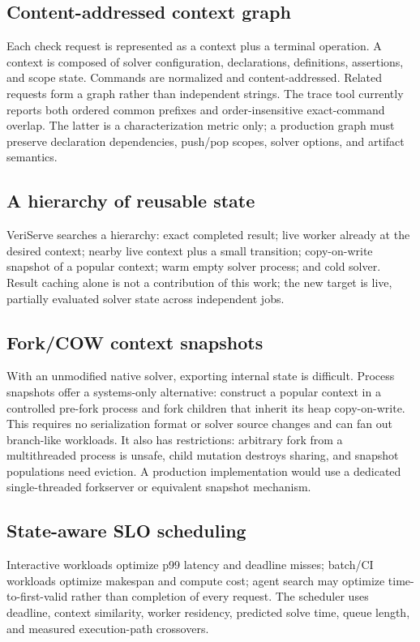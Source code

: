 \documentclass[10pt,twocolumn]{article}
\begin{document}
\subsection{Content-addressed context graph}
Each check request is represented as a context plus a terminal operation. A context is composed of solver configuration, declarations, definitions, assertions, and scope state. Commands are normalized and content-addressed. Related requests form a graph rather than independent strings. The trace tool currently reports both ordered common prefixes and order-insensitive exact-command overlap. The latter is a characterization metric only; a production graph must preserve declaration dependencies, push/pop scopes, solver options, and artifact semantics.

\subsection{A hierarchy of reusable state}
VeriServe searches a hierarchy: exact completed result; live worker already at the desired context; nearby live context plus a small transition; copy-on-write snapshot of a popular context; warm empty solver process; and cold solver. Result caching alone is not a contribution of this work; the new target is live, partially evaluated solver state across independent jobs.

\subsection{Fork/COW context snapshots}
With an unmodified native solver, exporting internal state is difficult. Process snapshots offer a systems-only alternative: construct a popular context in a controlled pre-fork process and fork children that inherit its heap copy-on-write. This requires no serialization format or solver source changes and can fan out branch-like workloads. It also has restrictions: arbitrary fork from a multithreaded process is unsafe, child mutation destroys sharing, and snapshot populations need eviction. A production implementation would use a dedicated single-threaded forkserver or equivalent snapshot mechanism.

\subsection{State-aware SLO scheduling}
Interactive workloads optimize p99 latency and deadline misses; batch/CI workloads optimize makespan and compute cost; agent search may optimize time-to-first-valid rather than completion of every request. The scheduler uses deadline, context similarity, worker residency, predicted solve time, queue length, and measured execution-path crossovers.
\end{document}
